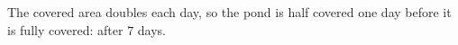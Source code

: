 The covered area doubles each day, so the pond is half covered one day before it is fully covered: after $\boxed{7}$ days.
